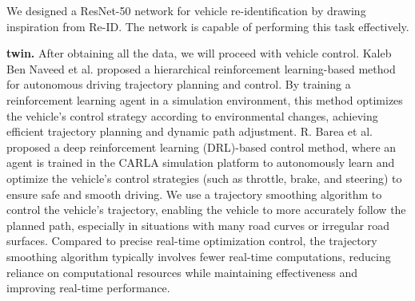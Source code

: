 We designed a ResNet-50 network for vehicle re-identification by drawing inspiration from Re-ID.
The network is capable of performing this task effectively.

\textbf{twin.}
After obtaining all the data, we will proceed with vehicle control. 
Kaleb Ben Naveed et al. proposed a hierarchical reinforcement learning-based method for autonomous driving trajectory planning and control. 
By training a reinforcement learning agent in a simulation environment, this method optimizes the vehicle's control strategy according to environmental changes, achieving efficient trajectory planning and dynamic path adjustment.\cite{Alpher22}
R. Barea et al. proposed a deep reinforcement learning (DRL)-based control method, where an agent is trained in the CARLA simulation platform to autonomously learn and optimize the vehicle's control strategies (such as throttle, brake, and steering) to ensure safe and smooth driving.\cite{Alpher21}
We use a trajectory smoothing algorithm to control the vehicle's trajectory, enabling the vehicle to more accurately follow the planned path, especially in situations with many road curves or irregular road surfaces. 
Compared to precise real-time optimization control, the trajectory smoothing algorithm typically involves fewer real-time computations, reducing reliance on computational resources while maintaining effectiveness and improving real-time performance.
